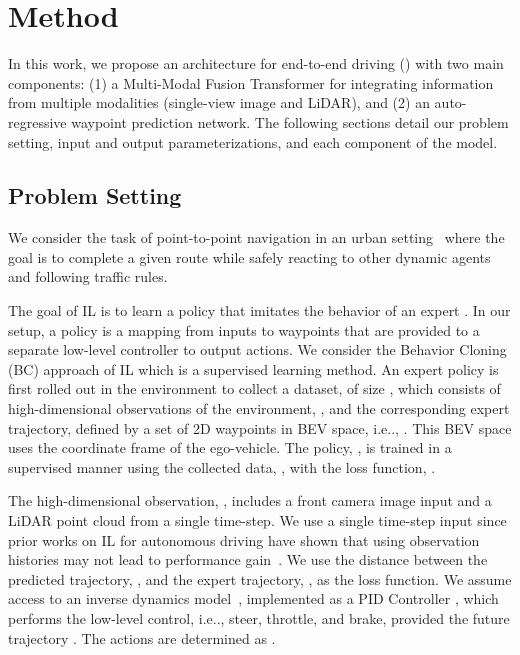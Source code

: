 \documentclass[final]{cvpr}
\makeatletter
\DeclareRobustCommand\onedot{\futurelet\@let@token\@onedot}
\def\@onedot{\ifx\@let@token.\else.\null\fi\xspace}
\def\ie{i.e\onedot} \def\Ie{I.e\onedot}
\newcommand{\boldparagraph}[1]{\vspace{0.1cm}\noindent{\bf #1:}}
\makeatother
\begin{document}
\section{Method}
\label{sec:method}

In this work, we propose an architecture for end-to-end driving () with two main components: (1) a Multi-Modal Fusion Transformer for integrating information from multiple modalities (single-view image and LiDAR), and (2) an auto-regressive waypoint prediction network. The following sections detail our problem setting, input and output parameterizations, and each component of the model.

\subsection{Problem Setting} \label{sec:problem_setting}
We consider the task of point-to-point navigation in an urban setting~\cite{Filos2020ICML, Rhinehart2019ICCV, Rhinehart2020ICLR, Chen2019CORL, Codevilla2019ICCV} where the goal is to complete a given route while safely reacting to other dynamic agents and following traffic rules.

\boldparagraph{Imitation Learning (IL)} The goal of IL is to learn a policy  that imitates the behavior of an expert . In our setup, a policy is a mapping from inputs to waypoints that are provided to a separate low-level controller to output actions.
We consider the Behavior Cloning (BC) approach of IL which is a supervised learning method. An expert policy is first rolled out in the environment to collect a dataset,  of size , which consists of high-dimensional observations of the environment, , and the corresponding expert trajectory, defined by a set of 2D waypoints in BEV space, \ie, . This BEV space uses the coordinate frame of the ego-vehicle. The policy, , is trained in a supervised manner using the collected data, , with the loss function, .

The high-dimensional observation, , includes a front camera image input and a LiDAR point cloud from a single time-step. We use a single time-step input since prior works on IL for autonomous driving have shown that using observation histories may not lead to performance gain~\cite{Muller2005NEURIPS, Wang2019IROS, Bansal2019RSS, Wen2020NEURIPS}. We use the  distance between the predicted trajectory, , and the expert trajectory, , as the loss function. We assume access to an inverse dynamics model~\cite{Bellman2015Princeton}, implemented as a PID Controller , which performs the low-level control, \ie, steer, throttle, and brake, provided the future trajectory . The actions are determined as .
\end{document}
